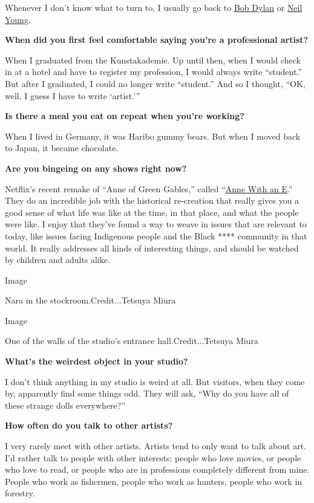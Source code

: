 Whenever I don't know what to turn to, I usually go back to
\href{https://www.nytimes.com/2020/06/12/arts/music/bob-dylan-rough-and-rowdy-ways.html}{Bob
Dylan} or \href{https://www.nytimes.com/topic/person/neil-young}{Neil
Young}.

\textbf{When did you first feel comfortable saying you're a professional
artist?}

When I graduated from the Kunstakademie. Up until then, when I would
check in at a hotel and have to register my profession, I would always
write ``student.'' But after I graduated, I could no longer write
``student.'' And so I thought, ``OK, well, I guess I have to write
`artist.'''

\textbf{Is there a meal you eat on repeat when you're working?}

When I lived in Germany, it was Haribo gummy bears. But when I moved
back to Japan, it became chocolate.

\textbf{Are you bingeing on any shows right now?}

Netflix's recent remake of ``Anne of Green Gables,'' called
``\href{https://www.netflix.com/title/80136311}{Anne With an E}.'' They
do an incredible job with the historical re-creation that really gives
you a good sense of what life was like at the time, in that place, and
what the people were like. I enjoy that they've found a way to weave in
issues that are relevant to today, like issues facing Indigenous people
and the Black **** community in that world. It really addresses all
kinds of interesting things, and should be watched by children and
adults alike.

Image

Nara in the stockroom.Credit...Tetsuya Miura

Image

One of the walls of the studio's entrance hall.Credit...Tetsuya Miura

\textbf{What's the weirdest object in your studio?}

I don't think anything in my studio is weird at all. But visitors, when
they come by, apparently find some things odd. They will ask, ``Why do
you have all of these strange dolls everywhere?''

\textbf{How often do you talk to other artists?}

I very rarely meet with other artists. Artists tend to only want to talk
about art. I'd rather talk to people with other interests: people who
love movies, or people who love to read, or people who are in
professions completely different from mine. People who work as
fishermen, people who work as hunters, people who work in forestry.

